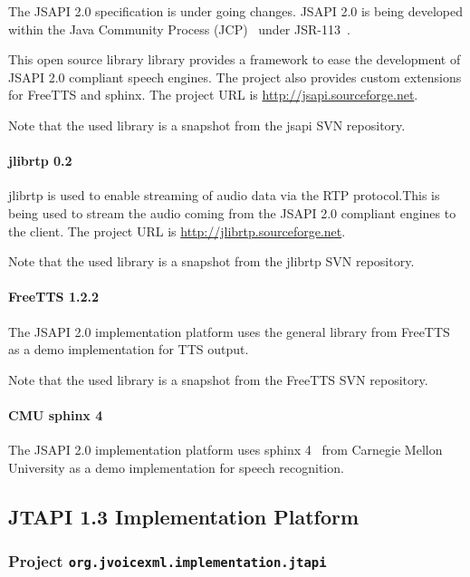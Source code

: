 \documentclass[11pt,a4paper]{article}
\begin{document}
The JSAPI 2.0 specification is under going changes.
JSAPI 2.0 is being developed within
the Java Community Process (JCP)~\cite{jcp} under 
JSR-113~\cite{jcp:jsr113}.

This open source library library provides a framework to ease the development of
JSAPI 2.0 compliant speech engines. The project also provides custom extensions for
FreeTTS and sphinx. The project URL is \url{http://jsapi.sourceforge.net}.

Note that the used library is a snapshot from the jsapi SVN repository.

\paragraph{jlibrtp 0.2}

jlibrtp is used to enable streaming of audio data via the RTP protocol.This
is being used to stream the audio coming from the JSAPI 2.0 compliant
engines to the client. The project URL is \url{http://jlibrtp.sourceforge.net}.

Note that the used library is a snapshot from the jlibrtp SVN repository.

\paragraph{FreeTTS 1.2.2}

The JSAPI 2.0 implementation platform uses the general library from
FreeTTS~\cite{freetts} as a demo implementation for TTS output.

Note that the used library is a snapshot from the FreeTTS SVN repository.

\paragraph{CMU sphinx 4}
\label{sec:sphinx}

The JSAPI 2.0 implementation platform uses sphinx 4~\cite{sphinx} from
Carnegie Mellon University as a demo implementation for speech recognition.

\subsection{JTAPI 1.3 Implementation Platform}
\subsubsection{Project \texttt{org.jvoicexml.implementation.jtapi}}
\end{document}
